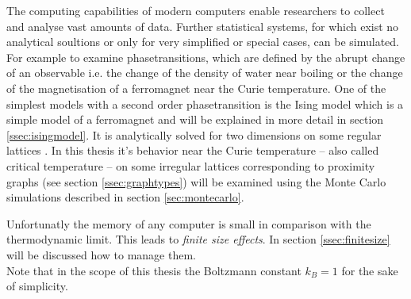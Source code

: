 The computing capabilities of modern computers enable researchers to
collect and analyse vast amounts of data.
Further statistical systems, for which exist no analytical soultions
or only for very simplified or special cases, can be simulated.
For example to examine phasetransitions, which are defined by the abrupt
change of an observable i.e. the change of the density of water near
boiling or the change of the magnetisation of a ferromagnet near the
Curie temperature. One of the simplest models with a second order
phasetransition is the Ising model \cite{Ising1925} which is a simple
model of a ferromagnet and will be explained in more detail in section
\ref{ssec:isingmodel}. It is analytically solved for two dimensions on
some regular lattices \cite{Onsager1944} \cite{Wannier1945}.
In this thesis it's behavior near the Curie temperature -- also called
critical temperature -- on some irregular lattices corresponding to
proximity graphs (see section \ref{ssec:graphtypes}) will be examined
using the Monte Carlo simulations described in section \ref{sec:montecarlo}.

Unfortunatly the memory of any computer is small in comparison with the
thermodynamic limit. This leads to \emph{finite size effects}.
In section \ref{ssec:finitesize} will be discussed how to manage them.\\

Note that in the scope of this thesis the Boltzmann constant \(k_{B}=1\)
for the sake of simplicity.
